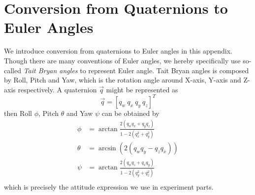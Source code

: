 \chapter{Conversion from Quaternions to Euler Angles}
\label{chap:appendix3}

We introduce conversion from quaternions to Euler angles in this appendix. Though there are many conventions of Euler angles, we hereby specifically use so-called \textit{Tait Bryan angles} to represent Euler angle. Tait Bryan angles is composed by Roll, Pitch and Yaw, which is the rotation angle around X-axis, Y-axis and Z-axis respectively. A quaternion $\vec{q}$ might be represented as
\begin{equation}
	\vec{q} = \left[ q_w \ q_x \ q_y \ q_z \right]^T
\end{equation}
then Roll $\phi$, Pitch $\theta$ and Yaw $\psi$ can be obtained by
\begin{align}
	\phi &= \arctan{\frac{2(q_w q_x+q_y q_z)}{1-2(q_x^2+q_y^2)}}\\
	\theta &= \arcsin{(2(q_wq_y-q_zq_x))}\\
	\psi &= \arctan{\frac{2(q_w q_z+q_x q_y)}{1-2(q_y^2+q_z^2)}}\\
\end{align}
which is precisely the attitude expression we use in experiment parts.
\clearpage
\newpage
